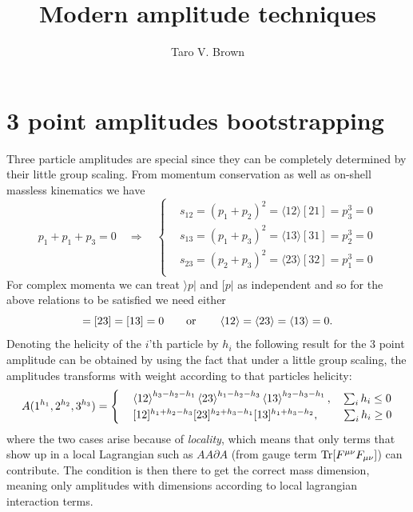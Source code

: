 \documentclass[a4paper,12pt]{article}
\title{Modern amplitude techniques}
\author[a]{Taro V. Brown}
\affiliation[a]{Department of Physics, UC Davis, One Shields Avenue, Davis, CA 95616, USA }
\begin{document}
 
\maketitle
\flushbottom
\newpage
\section{3 point amplitudes bootstrapping}
Three particle amplitudes are special since they can be completely determined by their little group scaling. From momentum conservation as well as on-shell massless kinematics we have
\begin{equation}
p_1+p_1+p_3=0\quad \Rightarrow\quad \begin{cases}
&s_{12}=(p_1+p_2)^2=\langle 12\rangle[21]=p_3^3=0\\
&s_{13}=(p_1+p_3)^2=\langle 13\rangle[31]=p_2^3=0\\
&s_{23}=(p_2+p_3)^2=\langle 23\rangle[32]=p_1^3=0\\
\end{cases}
\end{equation}
For complex momenta we can treat $\rangle p|$ and $[p|$ as independent and so for the above relations to be satisfied we need either
\begin{equation}
[12]=[23]=[13]=0\qquad\text{or}\qquad \expval{12}=\expval{23}=\expval{13}=0.
\end{equation}
Denoting the helicity of the $i$'th particle by $h_i$ the following result for the 3 point amplitude can be obtained by using the fact that under a little group scaling, the amplitudes transforms with weight according to that particles helicity:
\begin{equation}
A(1^{h_1},2^{h_2},3^{h_3})
=\begin{cases}
&\expval{12}^{h_3-h_2-h_1}\expval{23}^{h_1-h_2-h_3}\expval{13}^{h_2-h_3-h_1},\quad \sum_i h_i\leq 0\\
&[12]^{h_1+h_2-h_3}[23]^{h_2+h_3-h_1}[13]^{h_1+h_3-h_2},\qquad\: \sum_i h_i\geq 0
\end{cases}
\end{equation}
where the two cases arise because of \textit{locality}, which means that only terms that show up in a local Lagrangian such as $AA\partial A$ (from gauge term $\Tr[F^{\mu\nu}F_{\mu\nu}]$) can contribute. The condition is then there to get the correct mass dimension, meaning only amplitudes with dimensions according to local lagrangian interaction terms.
\end{document}
